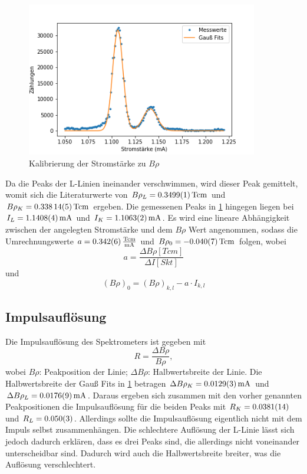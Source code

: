 \begin{figure}[h]
	\centering
	\includegraphics[width=0.9\textwidth]{../Messdaten/Kalibrierung.png}
	\caption{Kalibrierung der Stromstärke zu $B \rho$}
	\label{Kali}
\end{figure}

Da die Peaks der L-Linien ineinander verschwimmen, wird dieser Peak gemittelt, womit sich die Literaturwerte von $B \rho_{L} = \SI{0,3499 \pm 0,0001}{T cm}$ und $B \rho_{K} = \SI{0,33814 \pm 0,00005}{T cm}$ ergeben. Die gemessenen Peaks in \cref{Kali} hingegen liegen bei $I_{L} = \SI{1,1408 \pm 0,0004}{mA}$ und $I_{K} = \SI{1,1063 \pm 0,0002}{mA}$.
Es wird eine lineare Abhängigkeit zwischen der angelegten Stromstärke und dem $B \rho$ Wert angenommen, sodass die Umrechnungswerte $a = \SI{0,342 \pm 0,006}{\frac{T cm}{mA}}$ und $B \rho_{0} = \SI{-0,04 \pm 0,007}{T cm}$ folgen, wobei
\begin{equation}
	a = \frac{\Delta B \rho [T cm]}{\Delta I [Skt]}
\end{equation}
und 
\begin{equation}
	(B \rho)_{0} = (B \rho)_{k,l} - a \cdot I_{k,l}
\end{equation}

\subsection{Impulsauflösung}
Die Impulsauflösung des Spektrometers ist gegeben mit 
\begin{equation}
	R = \frac{\Delta B \rho}{B \rho},
\end{equation}
wobei $B \rho$: Peakposition der Linie; $\Delta B \rho$: Halbwertsbreite der Linie.
Die Halbwertsbreite der Gauß Fits in \cref{Kali} betragen $\Delta B \rho_{K} = \SI{0,0129 \pm 0,0003}{mA}$ und $\Delta B \rho_{L} = \SI{0,0176 \pm 0,0009}{mA}$. Daraus ergeben sich zusammen mit den vorher genannten Peakpositionen die Impulsauflösung für die beiden Peaks mit $R_{K} = \SI{0,0381 \pm 0,0014}{}$ und $R_{L} = \SI{0,050\pm 0,003}{}$. Allerdings sollte die Impulsauflösung eigentlich nicht mit dem Impuls selbst zusammenhängen. Die schlechtere Auflösung der L-Linie lässt sich jedoch dadurch erklären, dass es drei Peaks sind, die allerdings nicht voneinander unterscheidbar sind. Dadurch wird auch die Halbwertsbreite breiter, was die Auflösung verschlechtert.



